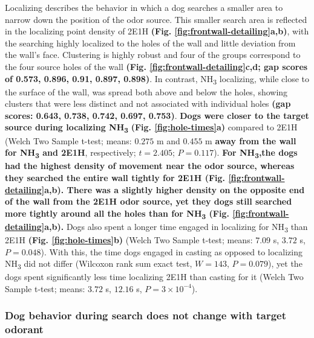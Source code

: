 \documentclass[
]{article}
\begin{document}
Localizing describes the behavior in which a dog searches a smaller area to narrow down the position of the odor source. This smaller search area is reflected in the localizing point density of 2E1H \textbf{(Fig. \ref{fig:frontwall-detailing}a,b)}, with the searching highly localized to the holes of the wall and little deviation from the wall's face. Clustering is highly robust and four of the groups correspond to the four source holes of the wall \textbf{(Fig. \ref{fig:frontwall-detailing}c,d; gap scores of 0.573, 0.896, 0.91, 0.897, 0.898)}. In contrast, NH\textsubscript{3} localizing, while close to the surface of the wall, was spread both above and below the holes, showing clusters that were less distinct and not associated with individual holes \textbf{(gap scores: 0.643, 0.738, 0.742, 0.697, 0.753)}. \textbf{Dogs were closer to the target source during localizing NH\textsubscript{3}} \textbf{(Fig. \ref{fig:hole-times}a)} compared to 2E1H (Welch Two Sample t-test; means: \(0.275\) m and \(0.455\) m \textbf{away from the wall for NH\textsubscript{3} and 2E1H}, respectively; \(t = 2.405\); \(P = 0.117\)). \textbf{For NH\textsubscript{3},the dogs had the highest density of movement near the odor source, whereas they searched the entire wall tightly for 2E1H (Fig. \ref{fig:frontwall-detailing}a,b). There was a slightly higher density on the opposite end of the wall from the 2E1H odor source, yet they dogs still searched more tightly around all the holes than for NH\textsubscript{3} (Fig. \ref{fig:frontwall-detailing}a,b).} Dogs also spent a longer time engaged in localizing for NH\textsubscript{3} than 2E1H \textbf{(Fig. \ref{fig:hole-times}b)} (Welch Two Sample t-test; means: \(7.09\) s, \(3.72\) s, \(P = 0.048\)). With this, the time dogs engaged in casting as opposed to localizing NH\textsubscript{3} did not differ (Wilcoxon rank sum exact test, \(W = 143\), \(P = 0.079\)), yet the dogs spent significantly less time localizing 2E1H than casting for it (Welch Two Sample t-test; means: \(3.72\) s, \(12.16\) s, \(P = \ensuremath{3\times 10^{-4}}\)).

\hypertarget{dog-behavior-during-search-does-not-change-with-target-odorant}{%
\subsubsection{Dog behavior during search does not change with target odorant}\label{dog-behavior-during-search-does-not-change-with-target-odorant}}
\end{document}
